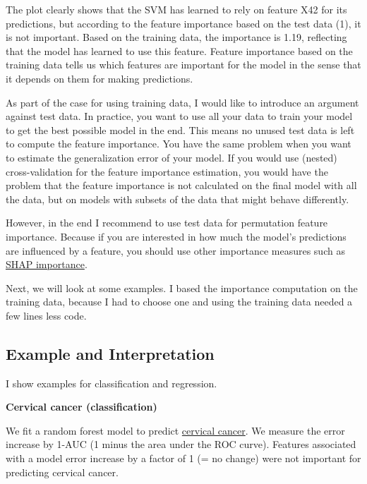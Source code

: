 \documentclass[
  10pt,
]{scrbook}
\begin{document}
The plot clearly shows that the SVM has learned to rely on feature X42 for its predictions, but according to the feature importance based on the test data (1), it is not important.
Based on the training data, the importance is 1.19, reflecting that the model has learned to use this feature.
Feature importance based on the training data tells us which features are important for the model in the sense that it depends on them for making predictions.

As part of the case for using training data, I would like to introduce an argument against test data.
In practice, you want to use all your data to train your model to get the best possible model in the end.
This means no unused test data is left to compute the feature importance.
You have the same problem when you want to estimate the generalization error of your model.
If you would use (nested) cross-validation for the feature importance estimation, you would have the problem that the feature importance is not calculated on the final model with all the data, but on models with subsets of the data that might behave differently.

However, in the end I recommend to use test data for permutation feature importance.
Because if you are interested in how much the model's predictions are influenced by a feature, you should use other importance measures such as \protect\hyperlink{shap-feature-importance}{SHAP importance}.

Next, we will look at some examples.
I based the importance computation on the training data, because I had to choose one and using the training data needed a few lines less code.

\hypertarget{example-and-interpretation}{%
\subsection{Example and Interpretation}\label{example-and-interpretation}}

I show examples for classification and regression.

\textbf{Cervical cancer (classification)}

We fit a random forest model to predict \protect\hyperlink{cervical}{cervical cancer}.
We measure the error increase by 1-AUC (1 minus the area under the ROC curve).
Features associated with a model error increase by a factor of 1 (= no change) were not important for predicting cervical cancer.
\end{document}
